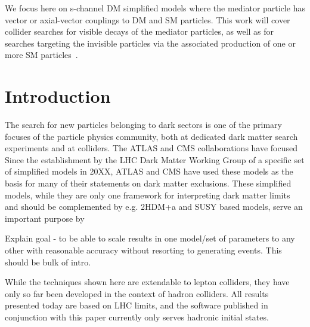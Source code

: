 \documentclass[a4paper, 11pt,notoc]{article}
\begin{document}
{We focus here on s-channel DM simplified models where the mediator particle has vector or axial-vector couplings to DM and SM particles. This work will cover collider searches for visible decays of the mediator particles, as well as for searches targeting the invisible particles via the associated production of one or more SM particles~\cite{ATL-PHYS-PUB-2020-021,CMSSummary}.
}  

\maketitle



\vskip10pt


%
%




\section{Introduction}
\label{sec:introduction}

The search for new particles belonging to dark sectors is one of the primary focuses of the particle physics community, both at dedicated dark matter search experiments and at colliders. The ATLAS and CMS collaborations have focused Since the establishment by the LHC Dark Matter Working Group of a specific set of simplified models in 20XX, ATLAS and CMS have used these models as the basis for many of their statements on dark matter exclusions. These simplified models, while they are only one framework for interpreting dark matter limits and should be complemented by e.g. 2HDM+a and SUSY based models, serve an important purpose by

Explain goal - to be able to scale results in one model/set of parameters to any other with reasonable accuracy without resorting to generating events. This should be bulk of intro.

While the techniques shown here are extendable to lepton colliders, they have only so far been developed in the context of hadron colliders. All results presented today are based on LHC limits, and the software published in conjunction with this paper currently only serves hadronic initial states. 
\end{document}
